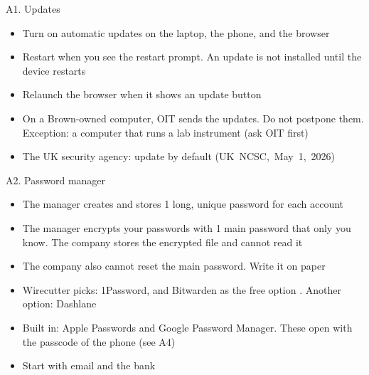 \documentclass[11pt]{beamer}
\newcommand{\srccite}[1]{{\scriptsize\textcolor{citecol}{#1}}}
\newcommand{\vfy}{\unskip}
\newcommand{\vfy}{\unskip\nobreakspace{\scriptsize\textcolor{citecol}{[verify]}}}
\renewcommand{\srccite}[1]{{\scriptsize\textcolor{citecol}{\mbox{#1}}}}
\begin{document}
\begin{frame}{A1. Updates}
\pause
\begin{itemize}\setlength\itemsep{9pt}
\item Turn on automatic updates on the laptop, the phone, and the browser \pause
\item Restart when you see the restart prompt. An update is not installed until the device restarts \pause
\item Relaunch the browser when it shows an update button \pause
\item On a Brown-owned computer, OIT sends the updates. Do not postpone them. Exception: a computer that runs a lab instrument (ask OIT first) \pause
\item The UK security agency: update by default \srccite{(UK NCSC, May 1, 2026)} \vfy
\end{itemize}
\end{frame}


\begin{frame}{A2. Password manager}
\pause
\begin{itemize}\setlength\itemsep{7pt}
\item The manager creates and stores 1 long, unique password for each account \pause
\item The manager encrypts your passwords with 1 main password that only you know. The company stores the encrypted file and cannot read it \vfy \pause
\item The company also cannot reset the main password. Write it on paper \pause
\item Wirecutter picks: 1Password, and Bitwarden as the free option \vfy. Another option: Dashlane \pause
\item Built in: Apple Passwords and Google Password Manager. These open with the passcode of the phone (see A4) \vfy \pause
\item Start with email and the bank
\end{itemize}
\end{frame}
\end{document}
